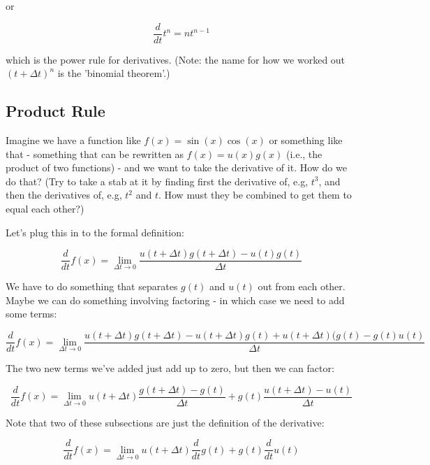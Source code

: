 or

\begin{equation*}
    \frac{d}{dt}t^n = nt^{n-1}
\end{equation*}

which is the power rule for derivatives. (Note: the name for how we worked out $(t+\Delta t)^n$ is the 'binomial theorem'.)

\subsection{Product Rule}

Imagine we have a function like $f(x) = \sin(x)\cos(x)$ or something like that - something that can be rewritten as $f(x) = u(x)g(x)$ (i.e., the product of two functions) - and we want to take the derivative of it. How do we do that? (Try to take a stab at it by finding first the derivative of, e.g, $t^3$, and then the derivatives of, e.g, $t^2$ and $t$. How must they be combined to get them to equal each other?)

Let's plug this in to the formal definition:

\begin{equation*}
    \frac{d}{dt}f(x) = \lim\limits_{\Delta t\rightarrow 0} \frac{u(t+\Delta t)g(t+\Delta t)-u(t)g(t)}{\Delta t}
\end{equation*}

We have to do something that separates $g(t)$ and $u(t)$ out from each other. Maybe we can do something involving factoring - in which case we need to add some terms:

\begin{equation*}
    \frac{d}{dt}f(x) = \lim\limits_{\Delta t\rightarrow 0}\frac{u(t+\Delta t)g(t+\Delta t)-u(t+\Delta t)g(t) + u(t+\Delta t)(g(t)-g(t)u(t)}{\Delta t}
\end{equation*}

The two new terms we've added just add up to zero, but then we can factor:

\begin{equation*}
    \frac{d}{dt}f(x) = \lim\limits_{\Delta t\rightarrow 0}u(t+\Delta t)\frac{g(t+\Delta t)-g(t)}{\Delta t} + g(t)\frac{u(t+\Delta t)-u(t)}{\Delta t}
\end{equation*}

Note that two of these subsections are just the definition of the derivative:

\begin{equation*}
    \frac{d}{dt}f(x) = \lim\limits_{\Delta t\rightarrow 0} u(t+\Delta t)\frac{d}{dt}g(t)+g(t)\frac{d}{dt}u(t)
\end{equation*}


